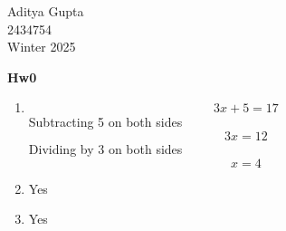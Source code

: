 \documentclass[12pt, a4paper]{article}
\newcommand{\doctitle}{Hw0}
\newcommand{\name}{Aditya Gupta}
\newcommand{\studentno}{2434754}
\newcommand{\todaydate}{Winter 2025}
\begin{document}
\begin{flushright}
\name \\
\studentno \\
\todaydate
\end{flushright}

\begin{center}
\Large
\bfseries
\doctitle
\end{center}

\thispagestyle{plain}



\begin{enumerate}

\item 
\[
3x+5=17
\]
Subtracting 5 on both sides
\[
3x = 12
\]
Dividing by 3 on both sides
\[
x = 4
\]
\item Yes
\item
Yes
\end{enumerate}
\end{document}

